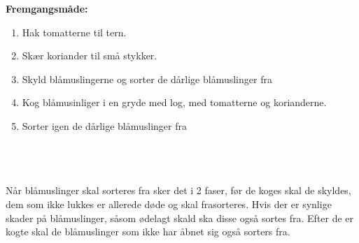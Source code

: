 \documentclass{book}
\begin{document}
\begin{minipage}[t]{0.5\textwidth}
\textbf{Fremgangsmåde:}
\begin{enumerate}
    \item Hak tomatterne til tern.
    \item Skær koriander til små stykker.
    \item Skyld blåmuslingerne og sorter de dårlige blåmuslinger fra
    \item Kog blåmusinliger i en gryde med log, med tomatterne og korianderne.
    \item Sorter igen de dårlige blåmuslinger fra
\end{enumerate}
\end{minipage}
\\ \\ \\ 
Når blåmuslinger skal sorteres fra sker det i 2 faser, før de koges skal de skyldes, dem som ikke lukkes er allerede døde og skal frasorteres. Hvis der er synlige skader på blåmuslinger, såsom ødelagt skald ska disse også sortes fra. Efter de er kogte skal de blåmuslinger som ikke har åbnet sig også sorters fra.
\newpage
\end{document}

